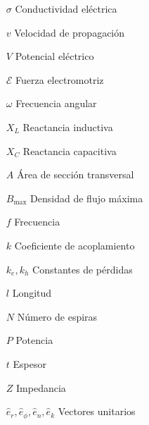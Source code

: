 \documentclass[10pt,conference]{IEEEtran}
\numberwithin{table}{section}
\begin{document}
\begin{itemize}[leftmargin=1.5cm]
    \item[$\sigma$] Conductividad eléctrica
    \item[$v$] Velocidad de propagación
    \item[$V$] Potencial eléctrico
    \item[$\mathcal{E}$] Fuerza electromotriz
    \item[$\omega$] Frecuencia angular
    \item[$X_L$] Reactancia inductiva
    \item[$X_C$] Reactancia capacitiva
    \item[$A$] Área de sección transversal
    \item[$B_{\text{max}}$] Densidad de flujo máxima
    \item[$f$] Frecuencia
    \item[$k$] Coeficiente de acoplamiento
    \item[$k_e, k_h$] Constantes de pérdidas
    \item[$l$] Longitud
    \item[$N$] Número de espiras
    \item[$P$] Potencia
    \item[$t$] Espesor
    \item[$Z$] Impedancia
    \item[$\hat{e}_r, \hat{e}_\phi, \hat{e}_n, \hat{e}_k$] Vectores unitarios
\end{itemize}
\end{document}
